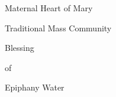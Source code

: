 

\phantom{Maternal Heart of Mary}

\bigskip

\centerline{\titelll Maternal Heart of Mary}

\bigskip

\centerline{\titelll Traditional Mass Community}

\vfill

\centerline{\titell Blessing}

\bigskip

\centerline{\titell of}

\bigskip

\centerline{\titell Epiphany Water}


\vfill






\bigskip

\eject